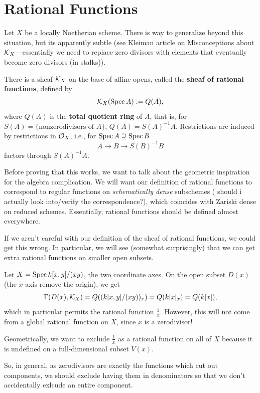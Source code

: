 \documentclass[12pt]{article}
\begin{document}
\section{Rational Functions}

Let $X$ be a locally Noetherian scheme. There is way to generalize beyond this situation, but its apparently subtle (see Kleiman article on Misconceptions about $\mathcal{K}_X$---essentially we need to replace zero divisors with elements that eventually become zero divisors (in stalks)).

\begin{thmdef}
    There is a sheaf $\mathcal{K}_X$ on the base of affine opens, called the \textbf{sheaf of rational functions}, defined by
    \[\mathcal{K}_X(\operatorname{Spec} A) := Q(A),\]
    where $Q(A)$ is the \textbf{total quotient ring} of $A$, that is, for $S(A)=\{\text{nonzerodivisors of }A\}$, $Q(A)=S(A)^{-1}A$. Restrictions are induced by restrictions in $\mathcal{O}_X$, i.e., for $\operatorname{Spec} A \supseteq \operatorname{Spec} B$
    \[A\to B \to S(B)^{-1} B\]
    factors through $S(A)^{-1}A$.
\end{thmdef}

Before proving that this works, we want to talk about the geometric inspiration for the algebra complication. We will want our definition of rational functions to correspond to regular functions on \textit{schematically dense} subschemes ({\color{red} should i actually look into/verify the correspondence?}), which coincides with Zariski dense on reduced schemes. Essentially, rational functions should be defined almost everywhere.

If we aren't careful with our definition of the sheaf of rational functions, we could get this wrong. In particular, we will see (somewhat surprisingly) that we can get extra rational functions on smaller open subsets.

\begin{eg}
    Let $X=\operatorname{Spec} k[x,y]/(xy)$, the two coordinate axes. On the open subset $D(x)$ (the $x$-axis remove the origin), we get
    \[\Gamma(D(x),\mathcal{K}_X) = Q((k[x,y]/(xy))_x) = Q(k[x]_x) = Q(k[x]),\]
    which in particular permits the rational function $\frac{1}{x}$. However, this will not come from a global rational function on $X$, since $x$ is a zerodivisor!

    Geometrically, we want to exclude $\frac{1}{x}$ as a rational function on all of $X$ because it is undefined on a full-dimensional subset $V(x)$.
\end{eg}

So, in general, as zerodivisors are exactly the functions which cut out components, we should exclude having them in denominators so that we don't accidentally exlcude an entire component.
\end{document}
